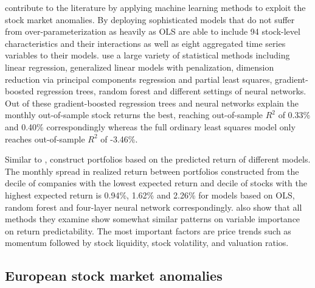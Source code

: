 \documentclass[12pt]{article}
\begin{document}
\citet{guetal} contribute to the literature by applying machine learning methods to exploit the stock market anomalies. By deploying sophisticated models that do not suffer from over-parameterization as heavily as OLS \citeauthor{guetal} are able to include 94 stock-level characteristics and their interactions as well as eight aggregated time series variables to their models.\footnotemark {} \citeauthor{guetal} use a large variety of statistical methods including linear regression, generalized linear models with penalization, dimension reduction via principal components regression and partial least squares, gradient-boosted regression trees, random forest and different settings of neural networks.\footnotemark {} Out of these gradient-boosted regression trees and neural networks explain the monthly out-of-sample stock returns the best, reaching out-of-sample $R^{2}$ of 0.33\% and 0.40\% correspondingly whereas the full ordinary least squares model only reaches out-of-sample $R^{2}$ of -3.46\%.\footnotemark {} \par

Similar to \citet{Lewellen2015}, \citeauthor{guetal} construct portfolios based on the predicted return of different models. The monthly spread in realized return between portfolios constructed from the decile of companies with the lowest expected return and decile of stocks with the highest expected return is 0.94\%, 1.62\% and 2.26\% for models based on OLS, random forest and four-layer neural network correspondingly.\footnotemark {} \citeauthor{guetal} also show that all methods they examine show somewhat similar patterns on variable importance on return predictability. The most important factors are price trends such as momentum followed by stock liquidity, stock volatility, and valuation ratios.\footnotemark {} \par

\subsection{European stock market anomalies}\label{EuropeanStockMarketAnomalies}
\end{document}
